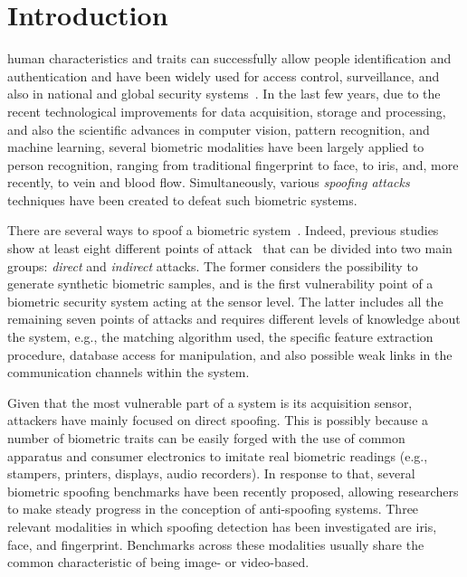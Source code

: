 \section{Introduction}

 human characteristics and traits can successfully allow people identification and authentication and have been widely used for access control, surveillance, and also in national and global security systems~\cite{Jain:2008}.
In the last few years, due to the recent technological improvements for data acquisition, storage and processing, and also the scientific advances in computer vision, pattern recognition, and machine learning, several biometric modalities have been largely applied to person recognition, ranging from traditional fingerprint to face, to iris, and, more recently, to vein and blood flow. Simultaneously, various \emph{spoofing attacks} techniques have been created to defeat such biometric systems. 

There are several ways to spoof a biometric system~\cite{Rathgeb:ICPR:2010,Rathgeb:CVPRW:2011}. Indeed, previous studies show at least eight different points of attack~\cite{Galbally:DATABASE:2007,Ratha:AVBPA:2001} that can be divided into two main groups: \emph{direct} and \emph{indirect} attacks. The former considers the possibility to generate synthetic biometric samples, and is the first vulnerability point of a biometric security system acting at the sensor level. The latter includes all the remaining seven points of attacks and requires different levels of knowledge about the system, e.g., the matching algorithm used, the specific feature extraction procedure, database access for manipulation, and also possible weak links in the communication channels within the system.


Given that the most vulnerable part of a system is its acquisition sensor, attackers have mainly focused on direct spoofing. This is possibly because a number of biometric traits can be easily forged with the use of common apparatus and consumer electronics to imitate real biometric readings (e.g., stampers, printers, displays, audio recorders). 
In response to that, several biometric spoofing benchmarks have been recently proposed, allowing researchers to make steady progress in the conception of anti-spoofing systems. Three relevant modalities in which spoofing detection has been investigated are iris, face, and fingerprint. Benchmarks across these modalities usually share the common characteristic of being image- or video-based.

